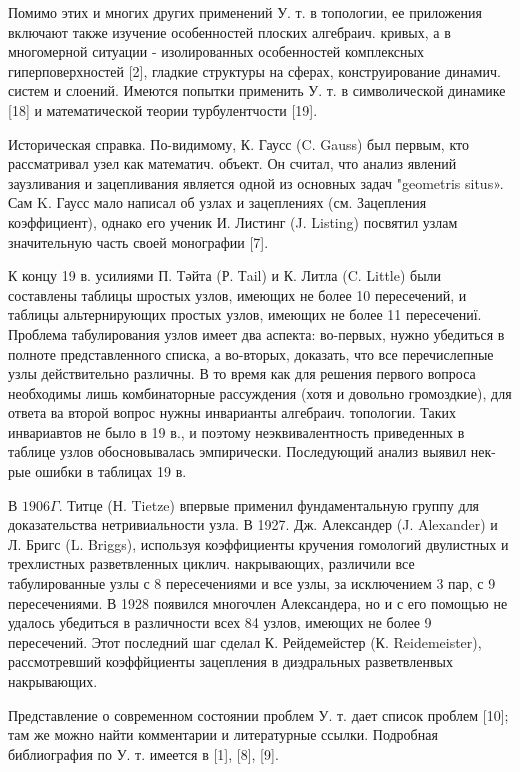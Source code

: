 \documentclass[10pt]{article}
\begin{document}
Помимо этих и многих других применений $У$. т. в топологии, ее приложения включают также изучение особенностей плоских алгебраич. кривых, а в многомерной ситуации - изолированных особенностей комплексных гиперповерхностей [2], гладкие структуры на сферах, конструирование динамич. систем и слоений. Имеются попытки применить У. т. в символической динамике [18] и математической теории турбулентчости [19].



Историческая справка. По-видимому, К. Гаусс (C. Gauss) был первым, кто рассматривал узел как математич. объект. Он считал, что анализ явлений заузливания и зацепливания является одной из основных задач "geometris situs». Сам K. Гаусс мало написал об узлах и зацеплениях (см. Зацепления коэффициент), однако его ученик И. Листинг (J. Listing) посвятил узлам значительную часть своей монографии [7].



К концу 19 в. усилиями П. Тәйта (Р. Тail) и К. Литла (C. Little) были составлены таблицы шростых узлов, имеющих не более 10 пересечений, и таблицы альтернирующих простых узлов, имеющих не более 11 пересечениї. Проблема табулирования узлов имеет два аспекта: во-первых, нужно убедиться в полноте представленного списка, а во-вторых, доказать, что все перечислепные узлы действительно различны. В то время как для решения первого вопроса необходимы лишь комбинаторные рассуждения (хотя и довольно громоздкие), для ответа ва второй вопрос нужны инварианты алгебраич. топологии. Таких инвариавтов не было в 19 в., и поэтому неэквивалентность приведенных в таблице узлов обосновывалась эмпирически. Последующий анализ выявил нек-рые ошибки в таблицах 19 в.



В $1906 \Gamma$. Титце (Н. Tietze) впервые применил фундаментальную группу для доказательства нетривиальности узла. В 1927. Дж. Александер (J. Alexander) и Л. Бригс (L. Briggs), используя коэффициенты кручения гомологий двулистных и трехлистных разветвленных циклич. накрывающих, различили все табулированные узлы с 8 пересечениями и все узлы, за исключением 3 пар, с 9 пересечениями. В 1928 появился многочлен Александера, но и с его помощью не удалось убедиться в различности всех 84 узлов, имеющих не более 9 пересечений. Этот последний шаг сделал К. Рейдемейстер (К. Reidemeister), рассмотревший коэффйциенты зацепления в диэдральных разветвленвых накрывающих.



Представление о современном состоянии проблем У. т. дает список проблем [10]; там же можно найти комментарии и литературные ссылки. Подробная библиография по У. т. имеется в [1], [8], [9].
\end{document}
